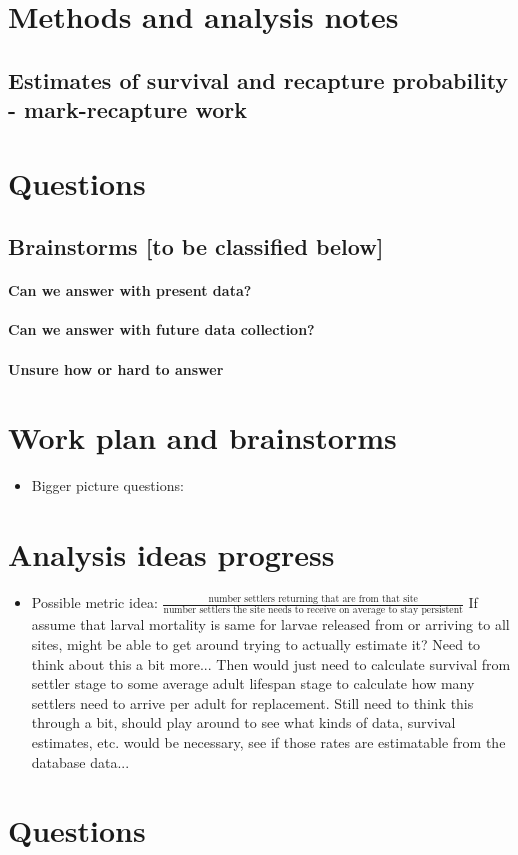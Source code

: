 \documentclass[12pt, oneside]{article}   	%
\begin{document}
\section*{Methods and analysis notes}
\subsection*{Estimates of survival and recapture probability - mark-recapture work}

\section*{Questions}
\subsection*{Brainstorms [to be classified below]}
\paragraph*{Can we answer with present data?}
\paragraph*{Can we answer with future data collection?}
\paragraph*{Unsure how or hard to answer}

\section*{Work plan and brainstorms}
\begin{itemize}
\item Bigger picture questions: 
\end{itemize}

\section*{Analysis ideas progress}
\begin{itemize}
\item Possible metric idea: $\frac{\text{number settlers returning that are from that site}}{\text{number settlers the site needs to receive on average to stay persistent}}$ If assume that larval mortality is same for larvae released from or arriving to all sites, might be able to get around trying to actually estimate it? Need to think about this a bit more... Then would just need to calculate survival from settler stage to some average adult lifespan stage to calculate how many settlers need to arrive per adult for replacement. Still need to think this through a bit, should play around to see what kinds of data, survival estimates, etc. would be necessary, see if those rates are estimatable from the database data...
\end{itemize}

\section*{Questions}



%
%
\end{document}
